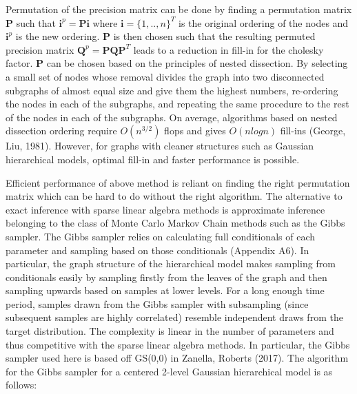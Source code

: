 \documentclass[]{article}
\begin{document}
Permutation of the precision matrix can be done by finding a permutation
matrix \(\boldsymbol{P}\) such that
\(\boldsymbol{i}^p = \boldsymbol{Pi}\) where
\(\boldsymbol{i} = \{1,..,n\}^T\) is the original ordering of the nodes
and \(\boldsymbol{i}^p\) is the new ordering. \(\boldsymbol{P}\) is then
chosen such that the resulting permuted precision matrix
\(\boldsymbol{Q}^p = \boldsymbol{PQP}^T\) leads to a reduction in
fill-in for the cholesky factor. \(\boldsymbol{P}\) can be chosen based
on the principles of nested dissection. By selecting a small set of
nodes whose removal divides the graph into two disconnected subgraphs of
almost equal size and give them the highest numbers, re-ordering the
nodes in each of the subgraphs, and repeating the same procedure to the
rest of the nodes in each of the subgraphs. On average, algorithms based
on nested dissection ordering require \(O(n^{3/2})\) flops and gives
\(O(n logn)\) fill-ins (George, Liu, 1981). However, for graphs with
cleaner structures such as Gaussian hierarchical models, optimal fill-in
and faster performance is possible. \newline \newline \newline

 \newline 

Efficient performance of above method is reliant on finding the right
permutation matrix which can be hard to do without the right algorithm.
The alternative to exact inference with sparse linear algebra methods is
approximate inference belonging to the class of Monte Carlo Markov Chain
methods such as the Gibbs sampler. The Gibbs sampler relies on
calculating full conditionals of each parameter and sampling based on
those conditionals (Appendix A6). In particular, the graph structure of
the hierarchical model makes sampling from conditionals easily by
sampling firstly from the leaves of the graph and then sampling upwards
based on samples at lower levels. For a long enough time period, samples
drawn from the Gibbs sampler with subsampling (since subsequent samples
are highly correlated) resemble independent draws from the target
distribution. The complexity is linear in the number of parameters and
thus competitive with the sparse linear algebra methods. In particular,
the Gibbs sampler used here is based off GS(0,0) in Zanella, Roberts
(2017). The algorithm for the Gibbs sampler for a centered 2-level
Gaussian hierarchical model is as follows:
\end{document}
